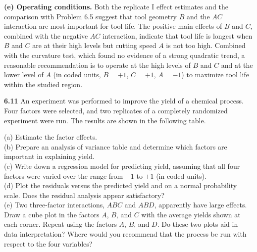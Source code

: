 \documentclass[answers,12pt,addpoints]{exam}
\begin{document}
\begin{solution}
\medskip
\textbf{(e) Operating conditions.}
Both the replicate I effect estimates and the comparison with Problem 6.5 suggest that tool geometry $B$ and the $AC$ interaction are most important for tool life. The positive main effects of $B$ and $C$, combined with the negative $AC$ interaction, indicate that tool life is longest when $B$ and $C$ are at their high levels but cutting speed $A$ is not too high. Combined with the curvature test, which found no evidence of a strong quadratic trend, a reasonable recommendation is to operate at the high levels of $B$ and $C$ and at the lower level of $A$ (in coded units, $B=+1$, $C=+1$, $A=-1$) to maximize tool life within the studied region.

\end{solution}

\textbf{6.11}
An experiment was performed to improve the yield of a chemical process. Four factors were selected, and two replicates of a completely randomized experiment were run. The results are shown in the following table.

\medskip
\noindent
(a) Estimate the factor effects.\\
(b) Prepare an analysis of variance table and determine which factors are important in explaining yield.\\
(c) Write down a regression model for predicting yield, assuming that all four factors were varied over the range from $-1$ to $+1$ (in coded units).\\
(d) Plot the residuals versus the predicted yield and on a normal probability scale. Does the residual analysis appear satisfactory?\\
(e) Two three-factor interactions, $ABC$ and $ABD$, apparently have large effects. Draw a cube plot in the factors $A$, $B$, and $C$ with the average yields shown at each corner. Repeat using the factors $A$, $B$, and $D$. Do these two plots aid in data interpretation? Where would you recommend that the process be run with respect to the four variables?
\end{document}
